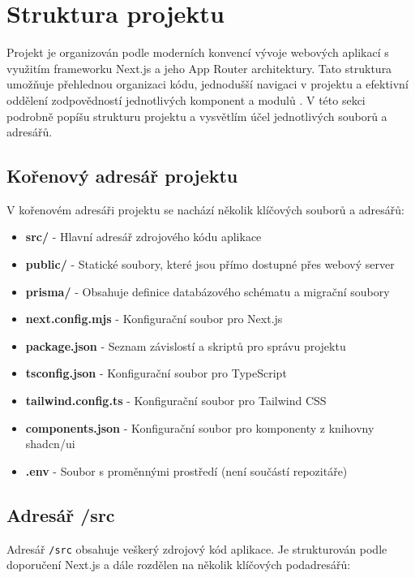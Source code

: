 \documentclass[12pt]{article}
\begin{document}
\newpage
\section{Struktura projektu}

Projekt je organizován podle moderních konvencí vývoje webových aplikací s využitím frameworku Next.js a jeho App Router architektury. Tato struktura umožňuje přehlednou organizaci kódu, jednodušší navigaci v projektu a efektivní oddělení zodpovědností jednotlivých komponent a modulů \citep{Vercel2023}. V této sekci podrobně popíšu strukturu projektu a vysvětlím účel jednotlivých souborů a adresářů.

\subsection{Kořenový adresář projektu}

V kořenovém adresáři projektu se nachází několik klíčových souborů a adresářů:

\begin{itemize}
  \item \textbf{src/} - Hlavní adresář zdrojového kódu aplikace
  \item \textbf{public/} - Statické soubory, které jsou přímo dostupné přes webový server
  \item \textbf{prisma/} - Obsahuje definice databázového schématu a migrační soubory
  \item \textbf{next.config.mjs} - Konfigurační soubor pro Next.js
  \item \textbf{package.json} - Seznam závislostí a skriptů pro správu projektu
  \item \textbf{tsconfig.json} - Konfigurační soubor pro TypeScript
  \item \textbf{tailwind.config.ts} - Konfigurační soubor pro Tailwind CSS
  \item \textbf{components.json} - Konfigurační soubor pro komponenty z knihovny shadcn/ui
  \item \textbf{.env} - Soubor s proměnnými prostředí (není součástí repozitáře)
\end{itemize}

\subsection{Adresář /src}

Adresář \texttt{/src} obsahuje veškerý zdrojový kód aplikace. Je strukturován podle doporučení Next.js a dále rozdělen na několik klíčových podadresářů:
\end{document}
